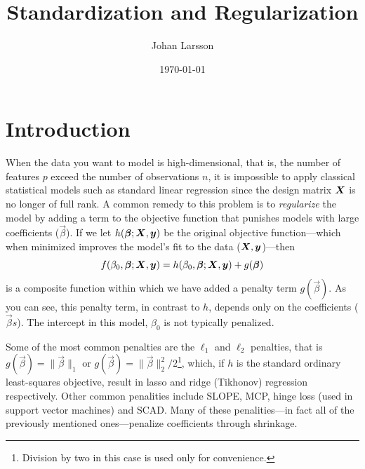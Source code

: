 


\title{Standardization and Regularization}
\author[1,*]{Johan Larsson}
\date{\today}

% 



\maketitle

\section{Introduction}

When the data you want to model is high-dimensional, that is, the number of features \(p\) exceed the number of observations \(n\), it is impossible to apply classical statistical models such as standard linear regression since the design matrix \(\mat X\) is no longer of full rank. A common remedy to this problem is to \emph{regularize} the model by adding a term to the objective function that punishes models with large coefficients (\(\vec\beta\)). If we let \(h(\vec\beta; \mat X, \vec y)\) be the original objective function---which when minimized improves the model's fit to the data (\(\mat X, \vec y\))---then
\[
  f(\beta_0, \vec\beta; \mat X, \vec y) = h(\beta_0, \vec\beta; \mat X, \vec y) + g(\vec\beta)
\]
is a composite function within which we have added a penalty term \(g(\vec\beta)\). As you can see, this penalty term, in contrast to \(h\), depends only on the coefficients (\(\vec{\beta}s\)). The intercept in this model, \(\beta_0\) is not typically penalized.

Some of the most common penalties are the \(\ell_1\) and \(\ell_2\) penalties, that is \(g(\vec\beta) = \lVert \vec\beta \rVert_1\) or \(g(\vec\beta) = \lVert \vec\beta \rVert_2^2/2\)\footnote{Division by two in this case is used only for convenience.}, which, if \(h\) is the standard ordinary least-squares objective, result in lasso and ridge (Tikhonov) regression respectively. Other common penalities include SLOPE, MCP, hinge loss (used in support vector machines) and SCAD. Many of these penalities---in fact all of the previously mentioned ones---penalize coefficients through shrinkage.

